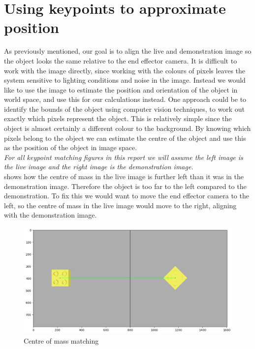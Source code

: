 \section{Using keypoints to approximate position}
\label{sec:keypoints}
As previously mentioned, our goal is to align the live and demonstration image so the object looks the same relative to the end effector camera. It is difficult to work with the image directly, since working with the colours of pixels leaves the system sensitive to lighting conditions and noise in the image. Instead we would like to use the image to estimate the position and orientation of the object in world space, and use this for our calculations instead. One approach could be to identify the bounds of the object using computer vision techniques, to work out exactly which pixels represent the object. This is relatively simple since the object is almost certainly a different colour to the background. By knowing which pixels belong to the object we can estimate the centre of the object and use this as the position of the object in image space.\\

\textit{For all keypoint matching figures in this report we will assume the left image is the live image and the right image is the demonstration image.}\\

 shows how the centre of mass in the live image is further left than it was in the demonstration image. Therefore the object is too far to the left compared to the demonstration. To fix this we would want to move the end effector camera to the left, so the centre of mass in the live image would move to the right, aligning with the demonstration image.

\begin{figure}[h]
    \centering
    \includegraphics[width=\textwidth]{figures/ideal_centre-of-mass.png}
    \caption{Centre of mass matching}
    \label{fig:centre-of-mass}
\end{figure}

